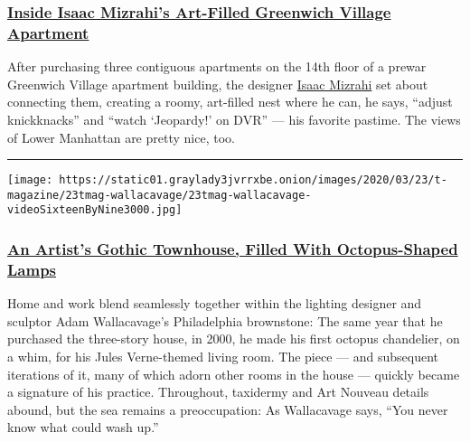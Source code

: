 \hypertarget{inside-isaac-mizrahis-art-filled-greenwich-village-apartment}{%
\subsubsection{\texorpdfstring{\textbf{\href{https://www.nytimes3xbfgragh.onion/2019/03/06/t-magazine/isaac-mizrahi-home-tour.html}{Inside
Isaac Mizrahi's Art-Filled Greenwich Village
Apartment}}}{Inside Isaac Mizrahi's Art-Filled Greenwich Village Apartment}}\label{inside-isaac-mizrahis-art-filled-greenwich-village-apartment}}

After purchasing three contiguous apartments on the 14th floor of a
prewar Greenwich Village apartment building, the designer
\href{https://www.nytimes3xbfgragh.onion/topic/person/isaac-mizrahi}{Isaac
Mizrahi} set about connecting them, creating a roomy, art-filled nest
where he can, he says, ``adjust knickknacks'' and ``watch `Jeopardy!' on
DVR'' --- his favorite pastime. The views of Lower Manhattan are pretty
nice, too.

\begin{center}\rule{0.5\linewidth}{\linethickness}\end{center}

\texttt{[image: https://static01.graylady3jvrrxbe.onion/images/2020/03/23/t-magazine/23tmag-wallacavage/23tmag-wallacavage-videoSixteenByNine3000.jpg]}

\hypertarget{an-artists-gothic-townhouse-filled-with-octopus-shaped-lamps}{%
\subsubsection{\texorpdfstring{\textbf{\href{https://www.nytimes3xbfgragh.onion/2020/03/25/t-magazine/adam-wallacavage-home.html}{An
Artist's Gothic Townhouse, Filled With Octopus-Shaped
Lamps}}}{An Artist's Gothic Townhouse, Filled With Octopus-Shaped Lamps}}\label{an-artists-gothic-townhouse-filled-with-octopus-shaped-lamps}}

Home and work blend seamlessly together within the lighting designer and
sculptor Adam Wallacavage's Philadelphia brownstone: The same year that
he purchased the three-story house, in 2000, he made his first octopus
chandelier, on a whim, for his Jules Verne-themed living room. The piece
--- and subsequent iterations of it, many of which adorn other rooms in
the house --- quickly became a signature of his practice. Throughout,
taxidermy and Art Nouveau details abound, but the sea remains a
preoccupation: As Wallacavage says, ``You never know what could wash
up.''

